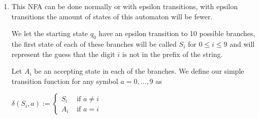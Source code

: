 \documentclass{article}
\theoremstyle{remark}
\begin{document}
\begin{enumerate}
\begin{enumerate}
\begin{center}
        \end{center}
        In this case $q_0$ has a loop with transitions for any $0,\dots, 9$ because 
        it handles the cases in which we do not know the ending digit, if we did not put that loop, then 
        it would mean that the first digit must be the last one, which is not necessarily the language we want to compute.

        \item This NFA can be done normally or with epsilon transitions, 
        with epsilon transitions the amount of states of this automaton will be fewer.
        
        We let the starting state $q_0$ have an epsilon transition to 10 possible branches,
        the first state of each of these branches will be called $S_i$ for $0 \leq i \leq 9$ and will represent 
        the guess that the digit $i$ is not in the prefix of the string.
        
        Let $A_i$ be an accepting state in each of the branches. 
        We define our simple transition function for any symbol $a = 0,\dots, 9$ as 
        \begin{center}
            $\delta(S_i, a) := 
            \begin{cases}
                S_i & \text{ if } a \neq i\\
                A_i & \text{ if } a = i
            \end{cases}$
        \end{center}


\end{enumerate}
\end{enumerate}
\end{document}

